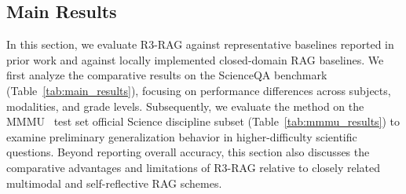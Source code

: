 \documentclass[a4paper, fleqn]{cas-dc}
\begin{document}
\begin{table}[t]
    \centering

    \caption{Performance comparison (\%) on the MMMU~\cite{Yue2024MMMU} test set official Science discipline subset, grouped by subject. The overall score is computed over 2,713 examples across Agriculture, Biology, Chemistry, Geography, Math, and Physics. Zero-shot baselines were re-evaluated locally on this specific subset, and the few-shot Qwen2.5-VL result is reported as an additional prompting reference. These scores are not intended to be directly comparable with full-MMMU leaderboard results.}
    \label{tab:mmmu_results}
    \vspace{2mm} 
    \renewcommand{\arraystretch}{1.25} 
    
\end{table}
\subsection{Main Results}\label{sec:main_results}
In this section, we evaluate R3-RAG against representative baselines reported in prior work and against locally implemented closed-domain RAG baselines.
We first analyze the comparative results on the ScienceQA benchmark (Table~\ref{tab:main_results}), focusing on performance differences across subjects, modalities, and grade levels.
Subsequently, we evaluate the method on the MMMU~\cite{Yue2024MMMU} test set official Science discipline subset (Table~\ref{tab:mmmu_results}) to examine preliminary generalization behavior in higher-difficulty scientific questions. Beyond reporting overall accuracy, this section also discusses the comparative advantages and limitations of R3-RAG relative to closely related multimodal and self-reflective RAG schemes.
\end{document}
